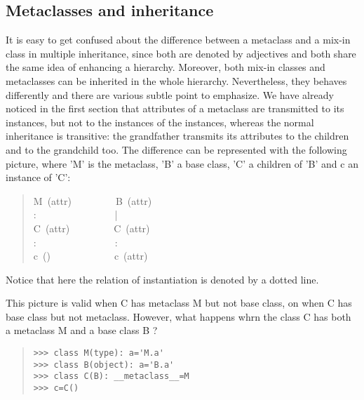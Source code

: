 \documentclass[10pt,english]{article}
\begin{document}

\hypertarget{metaclasses-and-inheritance}{}
\subsection*{Metaclasses and inheritance}

It is easy to get confused about the difference between a metaclass
and a mix-in class in multiple inheritance, since 
both are denoted by adjectives and both share the same idea of 
enhancing a hierarchy. Moreover, both mix-in classes and metaclasses 
can be inherited in the whole hierarchy.
Nevertheless, they behaves differently
and there are various subtle point to emphasize. We have already
noticed in the first section that attributes of a metaclass
are transmitted to its instances, but not to the instances of the
instances, whereas the normal inheritance is transitive: the 
grandfather transmits its attributes to the children and to the grandchild 
too. The difference can be represented with the following picture, where
'M' is the metaclass, 'B' a base class, 'C' a children of 'B'
and c an instance of 'C':
\begin{quote}
\begin{ttfamily}\begin{flushleft}
\mbox{M~(attr)~~~~~~~~~B~(attr)~~~}\\
\mbox{:~~~~~~~~~~~~~~~~|}\\
\mbox{C~(attr)~~~~~~~~~C~(attr)~~~~}\\
\mbox{:~~~~~~~~~~~~~~~~:}\\
\mbox{c~()~~~~~~~~~~~~~c~(attr)~~~~}
\end{flushleft}\end{ttfamily}
\end{quote}

Notice that here the relation of instantiation is denoted by a dotted line.

This picture is valid when C has metaclass M but not base class, on when C
has base class but not metaclass. However, what happens whrn the class C has 
both a metaclass M and a base class B ?
\begin{quote}
\begin{verbatim}>>> class M(type): a='M.a'
>>> class B(object): a='B.a'
>>> class C(B): __metaclass__=M
>>> c=C()\end{verbatim}
\end{quote}
\end{document}
